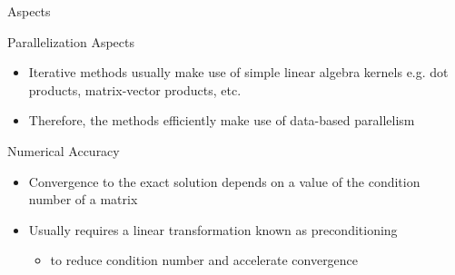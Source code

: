 \begin{frame}[t]{Aspects}
\small
\begin{block}{Parallelization Aspects}
	
	\begin{itemize}
		\item Iterative methods usually make use of simple linear algebra kernels e.g. dot products, matrix-vector products, etc.
		
		\item Therefore, the methods efficiently make use of data-based parallelism 
	\end{itemize}
\end{block}

\begin{block}{Numerical Accuracy}
	
	\begin{itemize}
		\item Convergence to the exact solution depends on a value of the  condition number of a matrix
		
		\item Usually requires a linear transformation known as preconditioning
		
		\begin{itemize}
			\item to reduce condition number and accelerate convergence
		\end{itemize}
	\end{itemize}
\end{block}
\end{frame}


